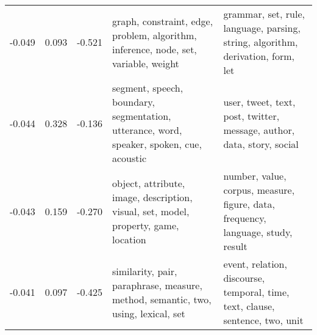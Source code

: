 \begin{tabular}{cccp{5cm}p{5cm}}
-0.049 & 0.093 & -0.521 & graph, constraint, edge, problem, algorithm, inference, node, set, variable, weight & grammar, set, rule, language, parsing, string, algorithm, derivation, form, let \\
-0.044 & 0.328 & -0.136 & segment, speech, boundary, segmentation, utterance, word, speaker, spoken, cue, acoustic & user, tweet, text, post, twitter, message, author, data, story, social \\
-0.043 & 0.159 & -0.270 & object, attribute, image, description, visual, set, model, property, game, location & number, value, corpus, measure, figure, data, frequency, language, study, result \\
-0.041 & 0.097 & -0.425 & similarity, pair, paraphrase, measure, method, semantic, two, using, lexical, set & event, relation, discourse, temporal, time, text, clause, sentence, two, unit \\
\bottomrule
\end{tabular}
